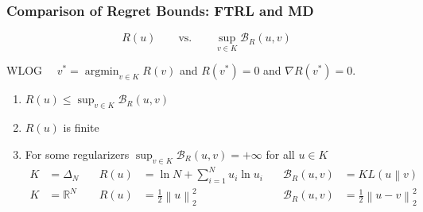 \documentclass[usenames,dvipsnames]{beamer}
\DeclareMathOperator*{\argmin}{argmin}
\newcommand{\R}{\mathbb{R}}
\newcommand{\norm}[1]{\left\|#1\right\|}
\newcommand{\KL}[2]{KL\left({#1}\middle\|{#2}\right)}
\newcommand{\grad}{\nabla}
\newcommand{\Breg}{\mathcal{B}}
\begin{document}
\begin{frame}
\frametitle{Comparison of Regret Bounds: FTRL and MD}

$$
R(u) \qquad \text{vs.} \qquad \sup_{v \in K}\Breg_{R}(u,v)
$$

\vspace{0.5cm}

WLOG \ \ $v^* = \argmin_{v \in K} R(v)$ and $R(v^*) = 0$ and $\grad R(v^*) = 0$.

\vspace{0.5cm}

\everymath{\displaystyle}
\begin{enumerate}
\item $R(u) \le \sup_{v \in K} \Breg_{R}(u,v)$
\item $R(u)$ is finite
\item For some regularizers $\sup_{v \in K} \Breg_{R}(u,v) = + \infty$ for all $u \in K$
\begin{align*}
K & = \Delta_N \quad & R(u) & = \ln N + \sum_{i=1}^N u_i \ln u_i  \quad & \Breg_R(u,v) & = \KL{u}{v} \\
K & = \R^N \quad & R(u) & = \frac{1}{2}\norm{u}_2^2 \quad  & \Breg_R(u,v) & = \frac{1}{2} \norm{u - v}_2^2 \\
\end{align*}

\end{enumerate}
\end{frame}
\end{document}
